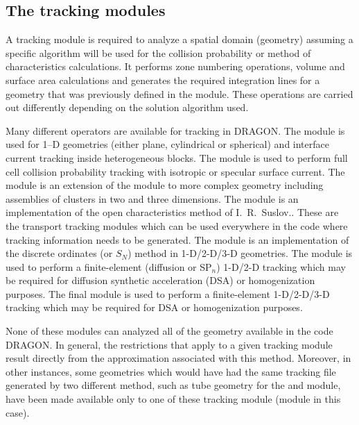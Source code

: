 \subsection{The tracking modules}\label{sect:TRKData}

A tracking module is required to analyze a spatial domain (geometry) assuming
a specific algorithm will be used for the collision probability or method of characteristics
calculations.  It performs zone numbering operations, volume and surface area
calculations and generates the required  integration lines for a geometry that
was previously defined in the  module. These operations are carried
out differently depending on the solution algorithm used.

\vskip 0.15cm

Many different operators are available for tracking in DRAGON. The  module
is used for 1--D geometries (either plane, cylindrical or spherical) and
interface current tracking inside heterogeneous blocks. The  module
is used to perform full cell collision probability tracking with
isotropic\cite{DragonPIJI,Mtl93a} or specular\cite{DragonPIJS1,Mtl93b}
surface current. The  module is an extension of the 
module to more complex geometry including assemblies of clusters in two and
three dimensions.\cite{ige260}  The  module is an implementation of the open
characteristics method of I.~R.~Suslov.\cite{mccg,suslov2}. These are the transport
tracking modules which can be used everywhere in the code where tracking
information needs to be generated. The  module is an implementation of
the discrete ordinates (or $S_N$) method in 1-D/2-D/3-D geometries.
The module  is used to perform a finite-element (diffusion or SP$_n$) 1-D/2-D
tracking which may be required for diffusion synthetic acceleration (DSA) or homogenization
purposes.\cite{BIVAC} The final module  is used to perform a finite-element
1-D/2-D/3-D tracking which may be required for DSA or homogenization purposes.\cite{TRIVAC}

\vskip 0.15cm

None of these modules can analyzed all of the geometry available in the code
DRAGON. In general, the restrictions that apply to a given tracking module
result directly from the approximation associated with this method. Moreover, in
other instances, some geometries which would have had the same tracking file
generated by two different method, such as tube geometry for the 
and  module, have been made available only to one of these tracking
module (module  in this case).

